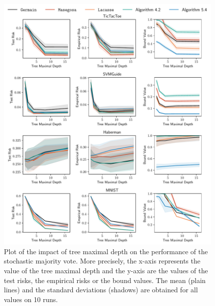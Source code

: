 \begin{noaddcontents}
\begin{figure}
    \centering
    \includegraphics[width=\textwidth]{chapter_5/figures/depth_2.pdf}
    \caption{
    Plot of the impact of tree maximal depth on the performance of the stochastic majority vote.
    More precisely, the x-axis represents the value of the tree maximal depth and the y-axis are the values of the test risks, the empirical risks or the bound values.
    The mean (plain lines) and the standard deviations (shadows) are obtained for all values on 10 runs.
    }
    \label{ap:mv-sto:fig:depth-2}
\end{figure}


\end{noaddcontents}
